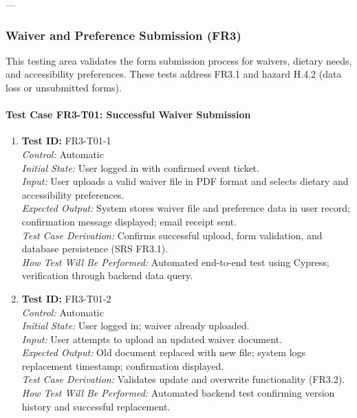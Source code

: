 \documentclass[12pt, titlepage]{article}
\begin{document}
---

\subsubsection{Waiver and Preference Submission (FR3)}

This testing area validates the form submission process for waivers, dietary needs, and accessibility preferences. These tests address FR3.1 and hazard H.4.2 (data loss or unsubmitted forms).

\paragraph{Test Case FR3-T01: Successful Waiver Submission}

\begin{enumerate}\setlength{\itemsep}{1em}
    \item \textbf{Test ID:} FR3-T01-1\\[0.5em]
    \textit{Control:} Automatic\\[0.3em]
    \textit{Initial State:} User logged in with confirmed event ticket.\\[0.3em]
    \textit{Input:} User uploads a valid waiver file in PDF format and selects dietary and accessibility preferences.\\[0.3em]
    \textit{Expected Output:} System stores waiver file and preference data in user record; confirmation message displayed; email receipt sent.\\[0.3em]
    \textit{Test Case Derivation:} Confirms successful upload, form validation, and database persistence (SRS FR3.1).\\[0.3em]
    \textit{How Test Will Be Performed:} Automated end-to-end test using Cypress; verification through backend data query.

    \item \textbf{Test ID:} FR3-T01-2\\[0.5em]
    \textit{Control:} Automatic\\[0.3em]
    \textit{Initial State:} User logged in; waiver already uploaded.\\[0.3em]
    \textit{Input:} User attempts to upload an updated waiver document.\\[0.3em]
    \textit{Expected Output:} Old document replaced with new file; system logs replacement timestamp; confirmation displayed.\\[0.3em]
    \textit{Test Case Derivation:} Validates update and overwrite functionality (FR3.2).\\[0.3em]
    \textit{How Test Will Be Performed:} Automated backend test confirming version history and successful replacement.
\end{enumerate}
\end{document}
